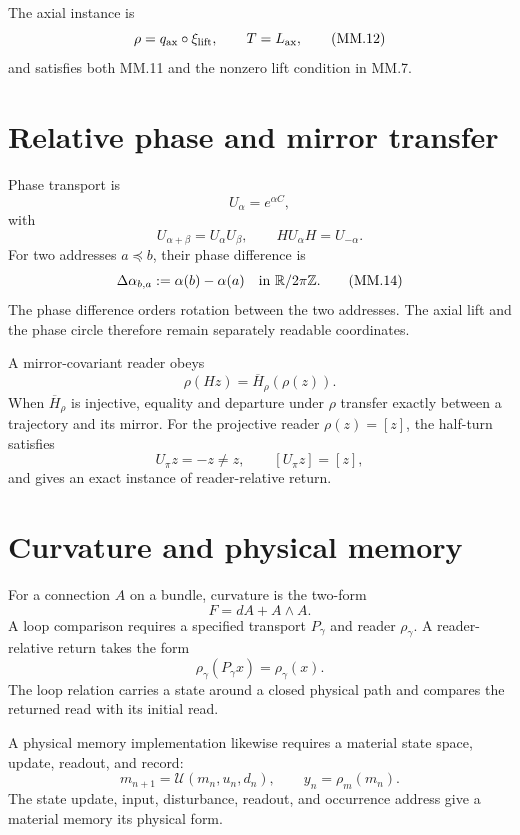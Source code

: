 \documentclass[10pt]{article}
\begin{document}
The axial instance is
\[
\rho=q_{\rm ax}\circ\xi_{\rm lift},\qquad T=L_{\rm ax},
\tag{MM.12}
\]
and satisfies both MM.11 and the nonzero lift condition in MM.7.

\section{Relative phase and mirror transfer}

Phase transport is
\[
U_\alpha=e^{\alpha C},
\]
with
\[
U_{\alpha+\beta}=U_\alpha U_\beta,\qquad
HU_\alpha H=U_{-\alpha}.
\tag{MM.13}
\]
For two addresses $a\preceq b$, their phase difference is
\[
\Delta\alpha_{b,a}:=\alpha(b)-\alpha(a)
\quad\text{in }\mathbb R/2\pi\mathbb Z.
\tag{MM.14}
\]
The phase difference orders rotation between the two addresses. The axial lift
and the phase circle therefore remain separately readable coordinates.

A mirror-covariant reader obeys
\[
\rho(Hz)=\overline H_\rho(\rho(z)).
\tag{MM.15}
\]
When $\overline H_\rho$ is injective, equality and departure under $\rho$
transfer exactly between a trajectory and its mirror. For the projective
reader $\rho(z)=[z]$, the half-turn satisfies
\[
U_\pi z=-z\ne z,
\qquad [U_\pi z]=[z],
\tag{MM.15a}
\]
and gives an exact instance of reader-relative return.

\section{Curvature and physical memory}

For a connection $A$ on a bundle, curvature is the two-form
\[
F=dA+A\wedge A.
\tag{MM.16}
\]
A loop comparison requires a specified transport $P_\gamma$ and reader
$\rho_\gamma$. A reader-relative return takes the form
\[
\rho_\gamma(P_\gamma x)=\rho_\gamma(x).
\tag{MM.17}
\]
The loop relation carries a state around a closed physical path and compares
the returned read with its initial read.

A physical memory implementation likewise requires a material state space,
update, readout, and record:
\[
m_{n+1}=\mathcal U(m_n,u_n,d_n),
\qquad y_n=\rho_m(m_n).
\tag{MM.18}
\]
The state update, input, disturbance, readout, and occurrence address give a
material memory its physical form.
\end{document}
